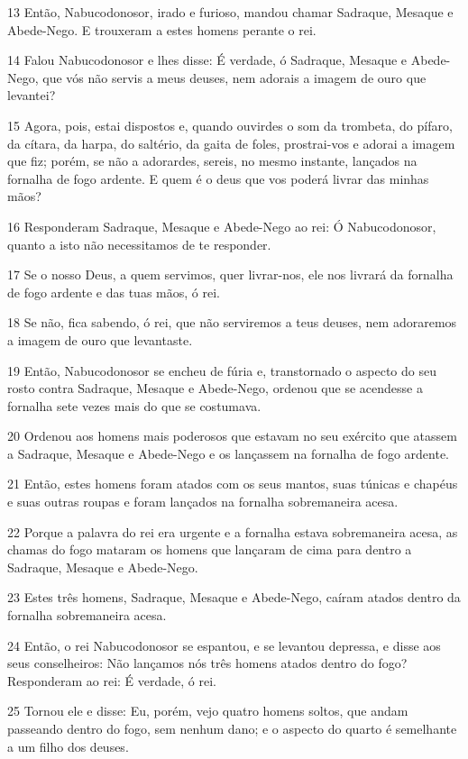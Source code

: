 \par 13 Então, Nabucodonosor, irado e furioso, mandou chamar Sadraque, Mesaque e Abede-Nego. E trouxeram a estes homens perante o rei.
\par 14 Falou Nabucodonosor e lhes disse: É verdade, ó Sadraque, Mesaque e Abede-Nego, que vós não servis a meus deuses, nem adorais a imagem de ouro que levantei?
\par 15 Agora, pois, estai dispostos e, quando ouvirdes o som da trombeta, do pífaro, da cítara, da harpa, do saltério, da gaita de foles, prostrai-vos e adorai a imagem que fiz; porém, se não a adorardes, sereis, no mesmo instante, lançados na fornalha de fogo ardente. E quem é o deus que vos poderá livrar das minhas mãos?
\par 16 Responderam Sadraque, Mesaque e Abede-Nego ao rei: Ó Nabucodonosor, quanto a isto não necessitamos de te responder.
\par 17 Se o nosso Deus, a quem servimos, quer livrar-nos, ele nos livrará da fornalha de fogo ardente e das tuas mãos, ó rei.
\par 18 Se não, fica sabendo, ó rei, que não serviremos a teus deuses, nem adoraremos a imagem de ouro que levantaste.
\par 19 Então, Nabucodonosor se encheu de fúria e, transtornado o aspecto do seu rosto contra Sadraque, Mesaque e Abede-Nego, ordenou que se acendesse a fornalha sete vezes mais do que se costumava.
\par 20 Ordenou aos homens mais poderosos que estavam no seu exército que atassem a Sadraque, Mesaque e Abede-Nego e os lançassem na fornalha de fogo ardente.
\par 21 Então, estes homens foram atados com os seus mantos, suas túnicas e chapéus e suas outras roupas e foram lançados na fornalha sobremaneira acesa.
\par 22 Porque a palavra do rei era urgente e a fornalha estava sobremaneira acesa, as chamas do fogo mataram os homens que lançaram de cima para dentro a Sadraque, Mesaque e Abede-Nego.
\par 23 Estes três homens, Sadraque, Mesaque e Abede-Nego, caíram atados dentro da fornalha sobremaneira acesa.
\par 24 Então, o rei Nabucodonosor se espantou, e se levantou depressa, e disse aos seus conselheiros: Não lançamos nós três homens atados dentro do fogo? Responderam ao rei: É verdade, ó rei.
\par 25 Tornou ele e disse: Eu, porém, vejo quatro homens soltos, que andam passeando dentro do fogo, sem nenhum dano; e o aspecto do quarto é semelhante a um filho dos deuses.
